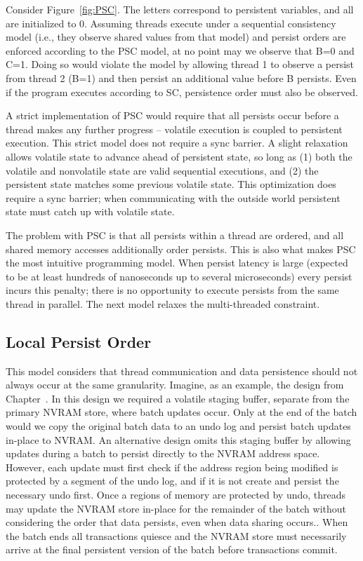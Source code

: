 Consider Figure~\ref{fig:PSC}.
The letters correspond to persistent variables, and all are initialized to 0.
Assuming threads execute under a sequential consistency model (i.e., they observe shared values from that model) and persist orders are enforced according to the PSC model, at no point may we observe that B=0 and C=1.
Doing so would violate the model by allowing thread 1 to observe a persist from thread 2 (B=1) and then persist an additional value before B persists.
Even if the program executes according to SC, persistence order must also be observed.

A strict implementation of PSC would require that all persists occur before a thread makes any further progress -- volatile execution is coupled to persistent execution.
This strict model does not require a sync barrier.
A slight relaxation allows volatile state to advance ahead of persistent state, so long as (1) both the volatile and nonvolatile state are valid sequential executions, and (2) the persistent state matches some previous volatile state.
This optimization does require a sync barrier; when communicating with the outside world persistent state must catch up with volatile state.

The problem with PSC is that all persists within a thread are ordered, and all shared memory accesses additionally order persists.
This is also what makes PSC the most intuitive programming model.
When persist latency is large (expected to be at least hundreds of nanoseconds up to several microseconds) every persist incurs this penalty; there is no opportunity to execute persists from the same thread in parallel.
The next model relaxes the multi-threaded constraint.

\subsection{Local Persist Order}
\label{sec:PMC:PersistenceModels:LPO}

This model considers that thread communication and data persistence should not always occur at the same granularity.
Imagine, as an example, the \GroupCommit design from Chapter~.
In this design we required a volatile staging buffer, separate from the primary NVRAM store, where batch updates occur.
Only at the end of the batch would we copy the original batch data to an undo log and persist batch updates in-place to NVRAM.
An alternative design omits this staging buffer by allowing updates during a batch to persist directly to the NVRAM address space.
However, each update must first check if the address region being modified is protected by a segment of the undo log, and if it is not create and persist the necessary undo first.
Once a regions of memory are protected by undo, threads may update the NVRAM store in-place for the remainder of the batch without considering the order that data persists, even when data sharing occurs..
When the batch ends all transactions quiesce and the NVRAM store must necessarily arrive at the final persistent version of the batch before transactions commit.

